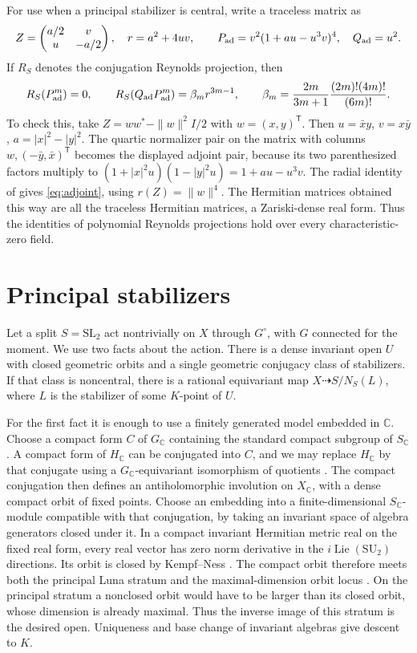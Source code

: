 \documentclass[11pt]{article}
\newcommand{\CC}{\mathbb C}
\newcommand{\SL}{\mathrm{SL}}
\newcommand{\SU}{\mathrm{SU}}
\newcommand{\Lie}{\operatorname{Lie}}
\begin{document}
For use when a principal stabilizer is central, write a traceless
matrix as
\[
 Z=\begin{pmatrix}a/2&v\\u&-a/2\end{pmatrix},\quad r=a^2+4uv,
 \qquad P_{\rm ad}=v^2(1+au-u^3v)^4,\quad Q_{\rm ad}=u^2 .
\]
If \(R_S\) denotes the conjugation Reynolds projection, then
\begin{equation}\label{eq:adjoint}
 R_S(P_{\rm ad}^m)=0,\qquad
 R_S(Q_{\rm ad}P_{\rm ad}^m)=\beta_m r^{3m-1},\qquad
 \beta_m=\frac{2m}{3m+1}\frac{(2m)!(4m)!}{(6m)!}.
\end{equation}
To check this, take \(Z=ww^*-\|w\|^2I/2\) with \(w=(x,y)^{\mathsf T}\).
Then \(u=\bar x y\), \(v=x\bar y\), \(a=|x|^2-|y|^2\).
The quartic normalizer pair on the matrix with columns
\(w,(-\bar y,\bar x)^{\mathsf T}\) becomes the displayed adjoint pair,
because its two parenthesized factors multiply to
\((1+|x|^2u)(1-|y|^2u)=1+au-u^3v\).
The radial identity of \cite[Section~5]{Complex} gives
\eqref{eq:adjoint}, using \(r(Z)=\|w\|^4\). The Hermitian matrices
obtained this way are all the traceless Hermitian matrices, a
Zariski-dense real form. Thus the identities of polynomial Reynolds
projections hold over every characteristic-zero field.

\section{Principal stabilizers}\label{sec:principal}

Let a split \(S=\SL_2\) act nontrivially on \(X\) through \(G^\circ\),
with \(G\) connected for the moment. We use two facts about the action.
There is a dense invariant open \(U\) with closed geometric orbits
and a single geometric conjugacy class of stabilizers. If that class
is noncentral, there is a rational equivariant map \(X\dashrightarrow
S/N_S(L)\), where \(L\) is the stabilizer of some \(K\)-point of \(U\).

For the first fact it is enough to use a finitely generated model
embedded in \(\CC\). Choose a compact form \(C\) of \(G_\CC\) containing
the standard compact subgroup of \(S_\CC\). A compact form of \(H_\CC\)
can be conjugated into \(C\), and we may replace \(H_\CC\) by that
conjugate using a \(G_\CC\)-equivariant isomorphism of quotients
\cite[Theorems~3.7--3.8]{AdamsTaibi}. The compact conjugation then
defines an antiholomorphic involution on \(X_\CC\), with a dense
compact orbit of fixed points. Choose an embedding into a
finite-dimensional \(S_\CC\)-module compatible with that
conjugation, by taking an invariant space of algebra generators
closed under it. In a compact invariant Hermitian metric real on
the fixed real form, every real vector has zero norm derivative
in the \(i\Lie(\SU_2)\) directions. Its orbit is closed by
Kempf--Ness \cite{KempfNess}. The compact orbit therefore meets both
the principal Luna stratum and the maximal-dimension orbit locus
\cite{Luna}. On the principal stratum a nonclosed orbit would
have to be larger than its closed orbit, whose dimension is
already maximal. Thus the inverse image of this stratum is the
desired open. Uniqueness and base change of invariant algebras
give descent to \(K\).
\end{document}
